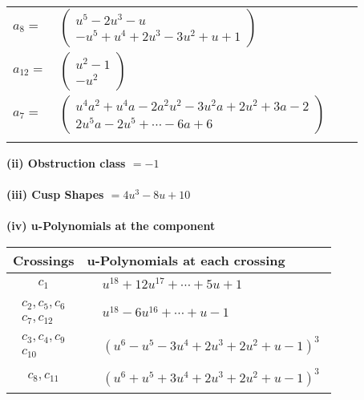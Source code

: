\documentclass[1p]{elsarticle_modified}
\theoremstyle{definition}
\begin{document}
\begin{tabular}{m{7pt} m{180pt} m{7pt} m{180pt} }
\flushright $a_{8}=$&$\begin{pmatrix}u^5-2 u^3- u\\- u^5+u^4+2 u^3-3 u^2+u+1\end{pmatrix}$ \\
\flushright $a_{12}=$&$\begin{pmatrix}u^2-1\\- u^2\end{pmatrix}$ \\
\flushright $a_{7}=$&$\begin{pmatrix}u^4 a^2+u^4 a-2 a^2 u^2-3 u^2 a+2 u^2+3 a-2\\2 u^5 a-2 u^5+\cdots-6 a+6\end{pmatrix}$\\&\end{tabular}
\flushleft \textbf{(ii) Obstruction class $= -1$}\\~\\
\flushleft \textbf{(iii) Cusp Shapes $= 4 u^3-8 u+10$}\\~\\
\newpage\renewcommand{\arraystretch}{1}
\flushleft \textbf{(iv) u-Polynomials at the component}\newline \\
\begin{tabular}{m{50pt}|m{274pt}}
Crossings & \hspace{64pt}u-Polynomials at each crossing \\
\hline $$\begin{aligned}c_{1}\end{aligned}$$&$\begin{aligned}
&u^{18}+12 u^{17}+\cdots+5 u+1
\end{aligned}$\\
\hline $$\begin{aligned}c_{2},c_{5},c_{6}\\c_{7},c_{12}\end{aligned}$$&$\begin{aligned}
&u^{18}-6 u^{16}+\cdots+u-1
\end{aligned}$\\
\hline $$\begin{aligned}c_{3},c_{4},c_{9}\\c_{10}\end{aligned}$$&$\begin{aligned}
&(u^6- u^5-3 u^4+2 u^3+2 u^2+u-1)^3
\end{aligned}$\\
\hline $$\begin{aligned}c_{8},c_{11}\end{aligned}$$&$\begin{aligned}
&(u^6+u^5+3 u^4+2 u^3+2 u^2+u-1)^3
\end{aligned}$\\
\hline
\end{tabular}\\~\\
\end{document}
